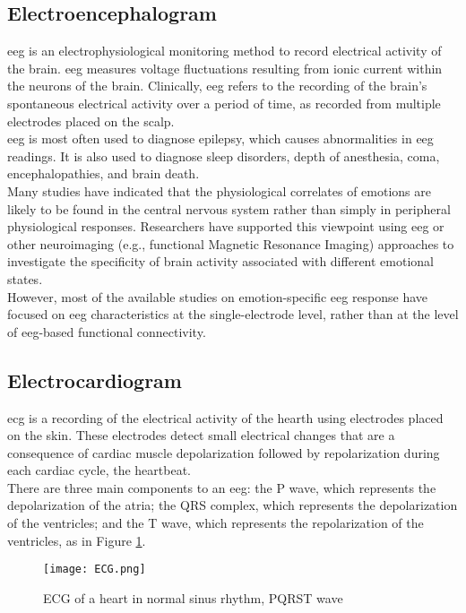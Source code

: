 \subsection{Electroencephalogram}
\gls{eeg} is an electrophysiological monitoring method to record electrical activity of the brain. \gls{eeg} measures voltage fluctuations resulting from ionic current within the neurons of the brain. Clinically, \gls{eeg} refers to the recording of the brain's spontaneous electrical activity over a period of time, as recorded from multiple electrodes placed on the scalp.
\\ \indent
\gls{eeg} is most often used to diagnose epilepsy, which causes abnormalities in \gls{eeg} readings. It is also used to diagnose sleep disorders, depth of anesthesia, coma, encephalopathies, and brain death.
\\ 
Many studies have indicated that the physiological correlates of emotions are likely to be found in the central nervous system rather than simply in peripheral physiological responses. Researchers have supported this viewpoint using \gls{eeg} or other neuroimaging (e.g., functional Magnetic Resonance Imaging) approaches to investigate the specificity of brain activity associated with different emotional states.
\\
However, most of the available studies on emotion-specific \gls{eeg} response have focused on \gls{eeg} characteristics at the single-electrode level, rather than at the level of \gls{eeg}-based functional connectivity.

\subsection{Electrocardiogram}
\gls{ecg} is a recording of the electrical activity of the hearth using electrodes placed on the skin. These electrodes detect small electrical changes that are a consequence of cardiac muscle depolarization followed by repolarization during each cardiac cycle, the heartbeat.
\\ \indent
There are three main components to an \gls{eeg}: the P wave, which represents the depolarization of the atria; the QRS complex, which represents the depolarization of the ventricles; and the T wave, which represents the repolarization of the ventricles, as in Figure \ref{fig:ECG}.
\begin{figure}[h]
    \centering
    \texttt{[image: ECG.png]} 
	\caption{ECG of a heart in normal sinus rhythm, PQRST wave}
    \label{fig:ECG}
\end{figure}

